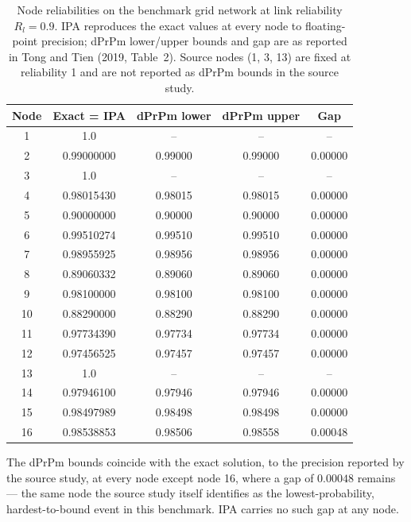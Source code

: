 \documentclass[preprint,12pt]{elsarticle}
\theoremstyle{definition}
\begin{document}
\begin{table}[t]
\centering\small
\caption{Node reliabilities on the benchmark grid network at link reliability $R_l=0.9$. IPA reproduces
the exact values at every node to floating-point precision; dPrPm lower/upper bounds and gap are as
reported in Tong and Tien (2019, Table~2). Source nodes (1, 3, 13) are fixed at reliability 1 and are
not reported as dPrPm bounds in the source study.}
\label{tab:grid_accuracy}
\begin{tabular}{ccccc}
\toprule
Node & Exact = IPA & dPrPm lower & dPrPm upper & Gap\\
\midrule
1  & 1.0        & --      & --      & --\\
2  & 0.99000000 & 0.99000 & 0.99000 & 0.00000\\
3  & 1.0        & --      & --      & --\\
4  & 0.98015430 & 0.98015 & 0.98015 & 0.00000\\
5  & 0.90000000 & 0.90000 & 0.90000 & 0.00000\\
6  & 0.99510274 & 0.99510 & 0.99510 & 0.00000\\
7  & 0.98955925 & 0.98956 & 0.98956 & 0.00000\\
8  & 0.89060332 & 0.89060 & 0.89060 & 0.00000\\
9  & 0.98100000 & 0.98100 & 0.98100 & 0.00000\\
10 & 0.88290000 & 0.88290 & 0.88290 & 0.00000\\
11 & 0.97734390 & 0.97734 & 0.97734 & 0.00000\\
12 & 0.97456525 & 0.97457 & 0.97457 & 0.00000\\
13 & 1.0        & --      & --      & --\\
14 & 0.97946100 & 0.97946 & 0.97946 & 0.00000\\
15 & 0.98497989 & 0.98498 & 0.98498 & 0.00000\\
16 & 0.98538853 & 0.98506 & 0.98558 & 0.00048\\
\bottomrule
\end{tabular}
\end{table}

The dPrPm bounds coincide with the exact solution, to the precision reported by the source study, at
every node except node 16, where a gap of $0.00048$ remains --- the same node the source study itself
identifies as the lowest-probability, hardest-to-bound event in this benchmark. IPA carries no such gap
at any node.
\end{document}
